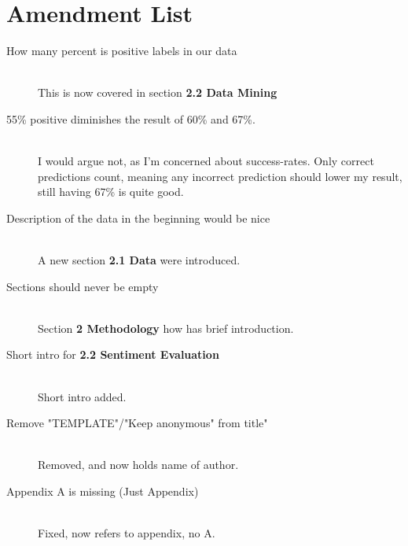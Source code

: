 \documentclass[11pt]{report} %
\begin{document}
\section*{Amendment List}
\begin{description}
\item[How many percent is positive labels in our data]\hfill\\{This is now covered in section \textbf{2.2 Data Mining}}
\item[55\% positive diminishes the result of 60\% and 67\%.]\hfill\\{I would argue not, as I'm concerned about success-rates. Only correct predictions count, meaning any incorrect prediction should lower my result, still having 67\% is quite good.}
\item[Description of the data in the beginning would be nice]\hfill\\{A new section \textbf{2.1 Data} were introduced.}
\item[Sections should never be empty]\hfill\\{Section \textbf{2 Methodology} how has brief introduction.}
\item[Short intro for \textbf{2.2 Sentiment Evaluation}]\hfill\\{Short intro added.}
\item[Remove "TEMPLATE"/"Keep anonymous" from title"]\hfill\\{Removed, and now holds name of author.}
\item[Appendix A is missing (Just Appendix)]\hfill\\{Fixed, now refers to appendix, no A.}
\end{description}



\end{document}

